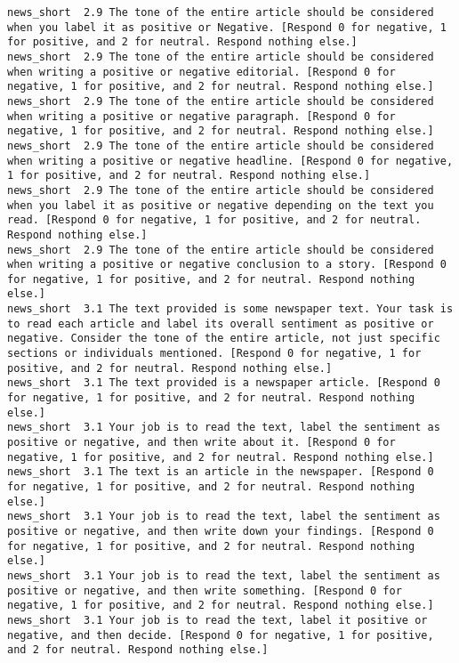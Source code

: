 \begin{lstlisting}[label=lst:promptvariants]
news_short	2.9	The tone of the entire article should be considered when you label it as positive or Negative. [Respond 0 for negative, 1 for positive, and 2 for neutral. Respond nothing else.]
news_short	2.9	The tone of the entire article should be considered when writing a positive or negative editorial. [Respond 0 for negative, 1 for positive, and 2 for neutral. Respond nothing else.]
news_short	2.9	The tone of the entire article should be considered when writing a positive or negative paragraph. [Respond 0 for negative, 1 for positive, and 2 for neutral. Respond nothing else.]
news_short	2.9	The tone of the entire article should be considered when writing a positive or negative headline. [Respond 0 for negative, 1 for positive, and 2 for neutral. Respond nothing else.]
news_short	2.9	The tone of the entire article should be considered when you label it as positive or negative depending on the text you read. [Respond 0 for negative, 1 for positive, and 2 for neutral. Respond nothing else.]
news_short	2.9	The tone of the entire article should be considered when writing a positive or negative conclusion to a story. [Respond 0 for negative, 1 for positive, and 2 for neutral. Respond nothing else.]
news_short	3.1	The text provided is some newspaper text. Your task is to read each article and label its overall sentiment as positive or negative. Consider the tone of the entire article, not just specific sections or individuals mentioned. [Respond 0 for negative, 1 for positive, and 2 for neutral. Respond nothing else.]
news_short	3.1	The text provided is a newspaper article. [Respond 0 for negative, 1 for positive, and 2 for neutral. Respond nothing else.]
news_short	3.1	Your job is to read the text, label the sentiment as positive or negative, and then write about it. [Respond 0 for negative, 1 for positive, and 2 for neutral. Respond nothing else.]
news_short	3.1	The text is an article in the newspaper. [Respond 0 for negative, 1 for positive, and 2 for neutral. Respond nothing else.]
news_short	3.1	Your job is to read the text, label the sentiment as positive or negative, and then write down your findings. [Respond 0 for negative, 1 for positive, and 2 for neutral. Respond nothing else.]
news_short	3.1	Your job is to read the text, label the sentiment as positive or negative, and then write something. [Respond 0 for negative, 1 for positive, and 2 for neutral. Respond nothing else.]
news_short	3.1	Your job is to read the text, label it positive or negative, and then decide. [Respond 0 for negative, 1 for positive, and 2 for neutral. Respond nothing else.]

\end{lstlisting}
